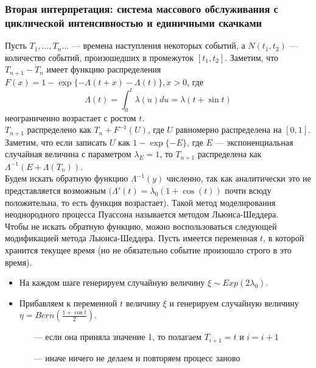\documentclass[11pt]{article}
\begin{document}
\subsubsection{Вторая интерпретация: система массового обслуживания с циклической интенсивностью и единичными скачками}
Пусть $T_1,\dots,T_n\dots$ --- времена наступления некоторых событий, а $N(t_1,t_2)$ --- количество событий, произошедших в промежуток $[t_1,t_2]$. Заметим, что $T_{n+1} - T_n$ имеет функцию распределения $F(x) = 1 - \exp\{-\Lambda(t + x) - \Lambda(t)\}, x > 0$, где 
\[\Lambda(t) = \int_{0}^{t}\lambda(u)du = \lambda(t + \sin t)\]
неограниченно возрастает с ростом $t$. \\
$T_{n+1}$ распределено как $T_n + F^{-1}(U)$, где $U$ равномерно распределена на $[0,1]$. Заметим, что если записать $U$ как $1-\exp\{-E\}$, где $E$ --- экспоненциальная случайная величина с параметром $\lambda_E = 1$, то $T_{n+1}$ распределена как $\Lambda^{-1}(E + \Lambda(T_n)).$\\
Будем искать обратную функцию $\Lambda^{-1}(y)$ численно, так как аналитически это не представляется возможным $(\Lambda'(t) = \lambda_0(1 + \cos (t))$ почти всюду положительна, то есть функция возрастает). Такой метод моделирования неоднородного процесса Пуассона называется методом Льюиса-Шеддера.\\
Чтобы не искать обратную функцию, можно воспользоваться следующей модификацией метода Льюиса-Шеддера. Пусть имеется переменная $t$, в которой хранится текущее время (но не обязательно событие произошло строго в это время).
\begin{itemize}
	\item На каждом шаге генерируем случайную величину $\xi \sim Exp(2\lambda_0)$.
	\item Прибавляем к переменной $t$ величину $\xi$ и генерируем случайную величину $\eta = Bern(\frac{1 + \cos t}{2}).$
	\begin{itemize}
		\item [---] если она приняла значение 1, то полагаем $T_{i+1} = t$ и $i = i+1$
		\item [---] иначе ничего не делаем и повторяем процесс заново
	\end{itemize}
\end{itemize}
 
\end{document}
